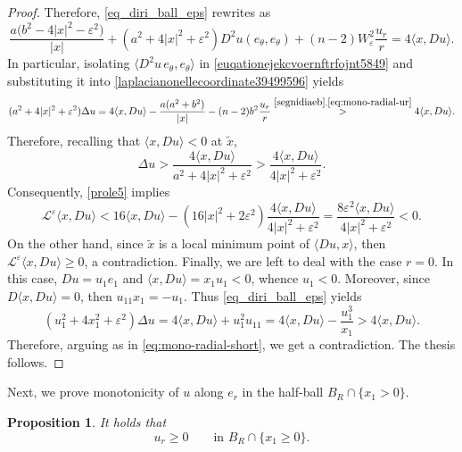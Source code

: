 \documentclass[11pt]{amsart}
\renewcommand{\geq}{\geqslant}
\renewcommand{\le}{<}
\renewcommand{\ge}{>}
\newcommand{\eps}{\varepsilon}
\newcommand{\Le}{\mathcal L^\eps}
\newtheorem{proposition}[theorem]{Proposition}
\theoremstyle{definition}
\theoremstyle{remark}
\numberwithin{equation}{section}
\begin{document}
\begin{proof}
Therefore, \eqref{eq_diri_ball_eps} rewrites as 
\begin{equation}\label{laplacianonellecoordinate39499596}
     \frac{a\bigl(b^2-4|x|^2-\varepsilon^2\bigr)}{|x|}
 +(a^2+4|x|^2+\varepsilon^2)D^2u(e_\theta,e_\theta)
 +(n-2)W_\varepsilon^2\frac{u_r}{r}=4\langle x,Du\rangle.
\end{equation}
In particular, isolating $\langle D^2 u\,e_\theta,e_\theta\rangle$ in \eqref{euqationejekcvoernftrfojnt5849} and substituting it into \eqref{laplacianonellecoordinate39499596} yields
\begin{equation}\label{eq:mono-radial-trace}
 (a^2+4|x|^2+\varepsilon^2)\Delta u
 =4\langle x,Du\rangle-\frac{a(a^2+b^2)}{|x|}-(n-2)b^2\frac{u_r}{r}
 \overset{\eqref{segnidiaeb},\eqref{eq:mono-radial-ur}}{>}4\langle x,Du\rangle.
\end{equation}
Therefore, recalling that $\langle x,Du\rangle<0$ at $\tilde x$, 
\[
 \Delta u>
 \frac{4\langle x,Du\rangle}{a^2+4|x|^2+\varepsilon^2}
 >\frac{4\langle x,Du\rangle}{4|x|^2+\varepsilon^2}.
\]
Consequently, \eqref{prole5} implies
\begin{equation}\label{eq:mono-radial-short}
 \Le\langle x,Du\rangle
 <16\langle x,Du\rangle-(16|x|^2+2\varepsilon^2)
       \frac{4\langle x,Du\rangle}{4|x|^2+\varepsilon^2}
 =\frac{8\varepsilon^2\langle x,Du\rangle}{4|x|^2+\varepsilon^2}<0.
\end{equation}
On the other hand, since $\tilde x$ is a local minimum point of $\langle Du,x\rangle$, then $\Le \langle x,Du\rangle\geq 0$, a contradiction. Finally, we are left to deal with the case $r=0$. In this case, $Du=u_1e_1$ and $\langle x,Du\rangle=x_1u_1<0$, whence $u_1\le 0$. Moreover, since $D\langle x,Du\rangle=0$, then $u_{11}x_1=-u_1$. Thus \eqref{eq_diri_ball_eps} yields
\[
 (u_1^2+4x_1^2+\varepsilon^2)\Delta u
 =4\langle x,Du\rangle+u_1^2u_{11}
 =4\langle x,Du\rangle-\frac{u_1^3}{x_1}>4\langle x,Du\rangle.
\]
Therefore, arguing as in \eqref{eq:mono-radial-short}, we get a contradiction. The thesis follows. 
\end{proof}
Next, we prove monotonicity of $u$ along $e_r$ in the half-ball $B_R\cap \{x_1\ge 0\}$.
\begin{proposition}\label{prop:mono-transverse}
It holds that 
\begin{equation}\label{eq:mono-transverse-positive}
    u_r\geq0\qquad\text{in }B_R\cap\{x_1\geq0\}.
\end{equation}
\end{proposition}
\end{document}
